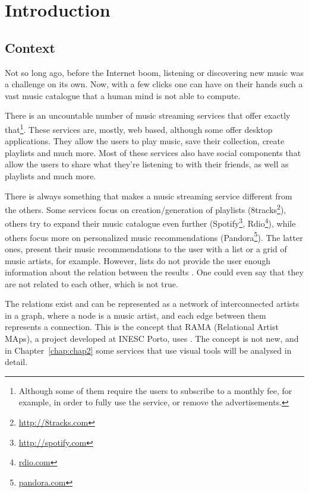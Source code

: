 
\chapter{Introduction} \label{chap:intro}


\section*{}

\section{Context} \label{sec:context}


  Not so long ago, before the Internet boom, listening or discovering new music was a challenge on its own.
  Now, with a few clicks one can have on their hands such a vast music catalogue that a human mind is not able to compute.

  There is an uncountable number of music streaming services that offer exactly that\footnote{Although some of them require the users to subscribe to a monthly fee, for example, in order to fully use the service, or remove the advertisements.}.
  These services are, mostly, web based, although some offer desktop applications.
  They allow the users to play music, save their collection, create playlists and much more.
  Most of these services also have social components that allow the users to share what they're listening to with their friends, as well as playlists and much more.

  There is always something that makes a music streaming service different from the others.
  Some services focus on creation/generation of playlists (8tracks\footnote{\url{http://8tracks.com}}), others try to expand their music catalogue even further (Spotify\footnote{\url{http://spotify.com}}, Rdio\footnote{\url{rdio.com}}), while others focus more on personalized music recommendations (Pandora\footnote{\url{pandora.com}}).
  The latter ones, present their music recommendations to the user with a list or a grid of music artists, for example.
  However, lists do not provide the user enough information about the relation between the results \cite{Lamere2008}.
  One could even say that they are not related to each other, which is not true.
  
  The relations exist and can be represented as a network of interconnected artists in a graph, where a node is a music artist, and each edge between them represents a connection.
  This is the concept that RAMA (Relational Artist MAps), a project developed at INESC Porto, uses \cite{Costa2008} \cite{Sarmento2009} \cite{Costa2009} \cite{Gouyon2011}.
  The concept is not new, and in Chapter~\ref{chap:chap2} some services that use visual tools will be analysed in detail.


